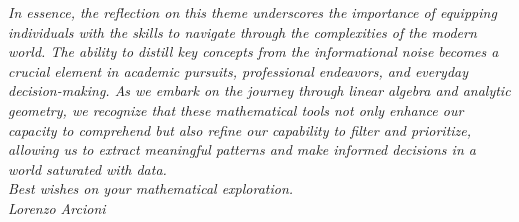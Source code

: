 \textit{In essence, the reflection on this theme underscores the importance of equipping individuals with the skills to navigate through the complexities of the modern world. The ability to distill key concepts from the informational noise becomes a crucial element in academic pursuits, professional endeavors, and everyday decision-making. As we embark on the journey through linear algebra and analytic geometry, we recognize that these mathematical tools not only enhance our capacity to comprehend but also refine our capability to filter and prioritize, allowing us to extract meaningful patterns and make informed decisions in a world saturated with data.}
\\

\textit{Best wishes on your mathematical exploration.}
\\

\textit{Lorenzo Arcioni}